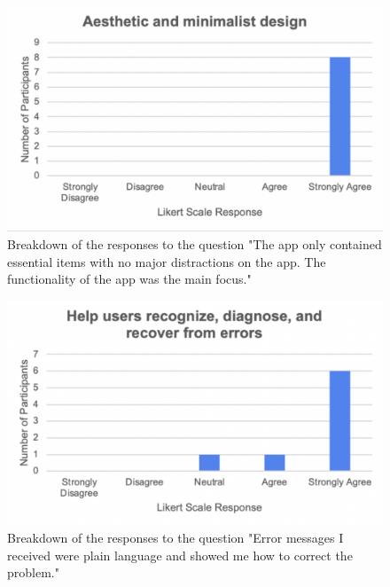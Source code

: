 \documentclass{l4proj}
\begin{document}
\begin{appendices}
\begin{figure}[H]
    \begin{centering}
    \includegraphics[scale=0.5]{images/heuristic8.pdf}
    \caption{Breakdown of the responses to the question "The app only contained essential items with no major distractions on the app. The functionality of the app was the main focus."}
    \label{fig: heuristic8}
    \end{centering}
\end{figure}

\begin{figure}[H]
    \begin{centering}
    \includegraphics[scale=0.5]{images/heuristic9.pdf}
    \caption{Breakdown of the responses to the question "Error messages I received were plain language and showed me how to correct the problem."}
    \label{fig: heuristic9}
    \end{centering}
\end{figure}


\end{appendices}
\end{document}
